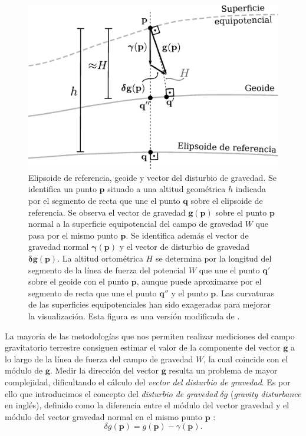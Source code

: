\begin{figure}[t!]
    \centering
    \includegraphics[width=\linewidth]{figs/surfaces.pdf}
    \caption{
        Elipsoide de referencia, geoide y vector del disturbio de gravedad.
        Se identifica un punto $\mathbf{p}$ situado a una altitud geométrica
        $h$ indicada por el segmento de recta que une el punto $\mathbf{q}$
        sobre el elipsoide de referencia.
        Se observa el vector de gravedad $\mathbf{g}(\mathbf{p})$ sobre el
        punto $\mathbf{p}$ normal a la superficie equipotencial del campo de
        gravedad $W$ que pasa por el mismo punto $\mathbf{p}$.
        Se identifica además el vector de gravedad normal
        $\boldsymbol\gamma(\mathbf{p})$ y el vector de disturbio de gravedad
        $\boldsymbol\delta \mathbf{g}(\mathbf{p})$.
        La altitud ortométrica $H$ se determina por la longitud del segmento de
        la línea de fuerza del potencial $W$ que une el punto $\mathbf{q'}$
        sobre el geoide con el punto $\mathbf{p}$, aunque puede aproximarse por
        el segmento de recta que une el punto $\mathbf{q''}$ y el punto
        $\mathbf{p}$.
        Las curvaturas de las superficies equipotenciales han sido exageradas
        para mejorar la visualización.
        Esta figura es una versión modificada de \citet{oliveira2021b}.
    }
    \label{fig:superficies-equipotenciales}
\end{figure}

La mayoría de las metodologías que nos permiten realizar mediciones del campo
gravitatorio terrestre consiguen estimar el valor de la componente del vector
$\mathbf{g}$ a lo largo de la línea de fuerza del campo de gravedad $W$, la
cual coincide con el módulo de $\mathbf{g}$.
Medir la dirección del vector $\mathbf{g}$ resulta un problema de mayor
complejidad, dificultando el cálculo del \emph{vector del disturbio de
gravedad}.
Es por ello que introducimos el concepto del \emph{disturbio de gravedad}
$\delta g$ (\emph{gravity disturbance} en inglés), definido como la diferencia
entre el módulo del vector gravedad y el módulo del vector gravedad normal en
el mismo punto $\mathbf{p}$
\citep{heiskanen1967,hofmannwellenhof2005,oliveira2018}:
%
\begin{equation}
    \delta g(\mathbf{p}) =
        g(\mathbf{p}) - \gamma(\mathbf{p}).
    \label{eq:gravity-disturbance}
\end{equation}

